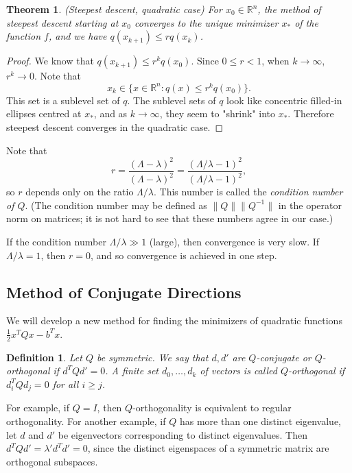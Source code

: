 \documentclass[11pt]{book}
\newcommand{\R}{\mathbb{R}}
\newtheorem{definition}{Definition}[subsection]
\newtheorem{theorem}{Theorem}[subsection]
\begin{document}
\begin{theorem}
(Steepest descent, quadratic case) For $x_0 \in \R^n$, the method of steepest descent starting at $x_0$ converges to the unique minimizer $x_*$ of the function $f$, and we have $q(x_{k+1}) \leq r q(x_k)$.
\end{theorem}
\begin{proof}
We know that $q(x_{k+1}) \leq r^k q(x_0)$. Since $0 \leq r < 1$, when $k \to \infty$, $r^k \to 0$. Note that
\[
x_k \in \{ x \in \R^n : q(x) \leq r^k q(x_0) \}.
\]
This set is a sublevel set of $q$. The sublevel sets of $q$ look like concentric filled-in ellipses centred at $x_*$, and as $k \to \infty$, they seem to "shrink" into $x_*$. Therefore steepest descent converges in the quadratic case.
\end{proof}

Note that
\[
r = \frac{(\Lambda - \lambda)^2}{(\Lambda - \lambda)^2} = \frac{( \Lambda / \lambda - 1 )^2}{(\Lambda / \lambda - 1)^2},
\]
so $r$ depends only on the ratio $\Lambda / \lambda$. This number is called the \emph{condition number of $Q$}. (The condition number may be defined as $\|Q\|\|Q^{-1}\|$ in the operator norm on matrices; it is not hard to see that these numbers agree in our case.) 

If the condition number $\Lambda / \lambda \gg 1$ (large), then convergence is very slow. If $\Lambda / \lambda = 1$, then $r = 0$, and so convergence is achieved in one step.

\subsection{Method of Conjugate Directions}

We will develop a new method for finding the minimizers of quadratic functions $\frac{1}{2}x^TQx - b^Tx$.

\begin{definition}
Let $Q$ be symmetric. We say that $d,d'$ are $Q$-conjugate or $Q$-orthogonal if $d^TQd' = 0$. A finite set $d_0, \dots, d_k$ of vectors is called $Q$-orthogonal if $d_i^TQd_j = 0$ for all $i \geq j$.
\end{definition}

For example, if $Q = I$, then $Q$-orthogonality is equivalent to regular orthogonality. For another example, if $Q$ has more than one distinct eigenvalue, let $d$ and $d'$ be eigenvectors corresponding to distinct eigenvalues. Then $d^TQd' = \lambda' d^Td' = 0$, since the distinct eigenspaces of a symmetric matrix are orthogonal subspaces.
\end{document}
